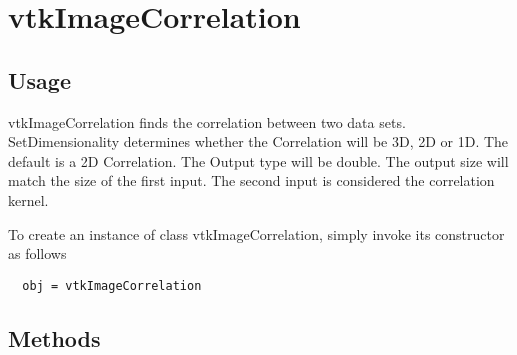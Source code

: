 \section{vtkImageCorrelation}

\subsection{Usage}

 vtkImageCorrelation finds the correlation between two data sets. 
 SetDimensionality determines
 whether the Correlation will be 3D, 2D or 1D.  
 The default is a 2D Correlation.  The Output type will be double.
 The output size will match the size of the first input.
 The second input is considered the correlation kernel.

To create an instance of class vtkImageCorrelation, simply
invoke its constructor as follows
\begin{verbatim}
  obj = vtkImageCorrelation
\end{verbatim}
\subsection{Methods}

